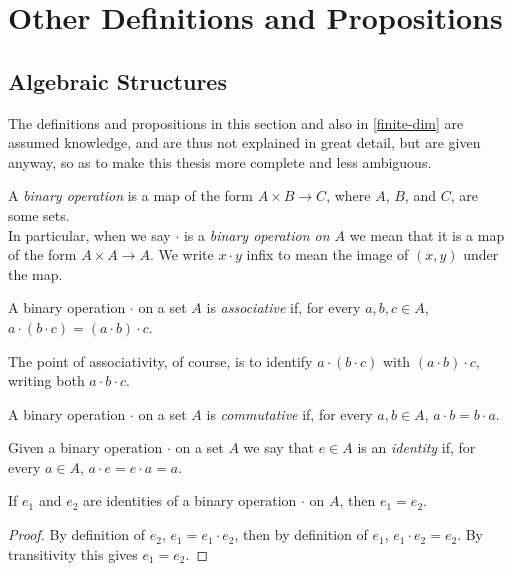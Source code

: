
\chapter[OTHER DEFINITIONS AND PROPOSITIONS]{Other Definitions and Propositions}\label{formalities}

\section{Algebraic Structures}

The definitions and propositions in this section and also in \autoref{finite-dim} are assumed knowledge, and are thus not explained in great detail, but are given anyway, so as to make this thesis more complete and less ambiguous.

\begin{define} A \emph{binary operation} is a map of the form $A \times B \to C$, where $A$, $B$, and $C$, are some sets.
\\In particular, when we say $\cdot$ is a \emph{binary operation on $A$} we mean that it is a map of the form $A \times A \to A$. We write $x \cdot y$ infix to mean the image of $(x, y)$ under the map.
\end{define}

\begin{define}[Associativity] A binary operation $\cdot$ on a set $A$ is \emph{associative} if, for every $a, b, c \in A$, $a \cdot (b \cdot c) = (a \cdot b) \cdot c$.
\end{define}

The point of associativity, of course, is to identify $a \cdot (b \cdot c)$ with $(a \cdot b) \cdot c$, writing both $a \cdot b \cdot c$.

\begin{define}[Commutativity] A binary operation $\cdot$ on a set $A$ is \emph{commutative} if, for every $a, b \in A$, $a \cdot b = b \cdot a$.
\end{define}

\begin{define}[Identity] Given a binary operation $\cdot$ on a set $A$ we say that $e \in A$ is an \emph{identity} if, for every $a \in A$, $a \cdot e = e \cdot a = a$.
\end{define}

\begin{prop} If $e_1$ and $e_2$ are identities of a binary operation $\cdot$ on $A$, then $e_1 = e_2$.
\end{prop}
\begin{proof}
By definition of $e_2$, $e_1 = e_1\cdot e_2$, then by definition of $e_1$, $e_1\cdot e_2 = e_2$. By transitivity this gives $e_1 = e_2$.
\end{proof}

